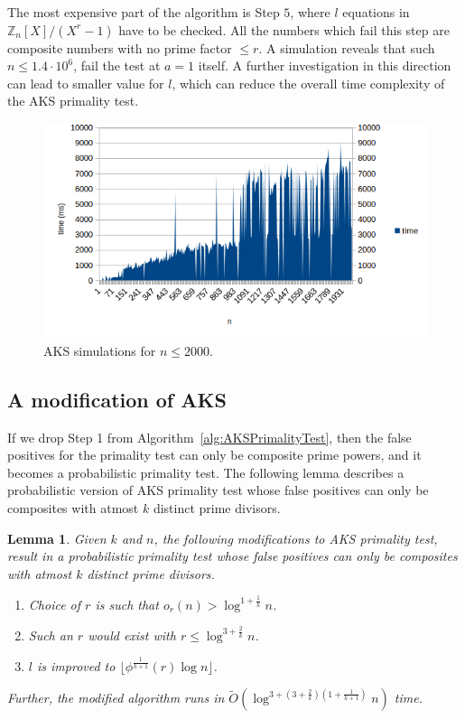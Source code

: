 \documentclass[11pt]{article}
\newtheorem{lemma}[theorem]{Lemma}
\begin{document}
The most expensive part of the algorithm is Step $5$, where $l$ equations in $\mathbb{Z}_n[X]/(X^r-1)$ have to be checked. All the numbers which fail this step are composite numbers with no prime factor $\leq r$. A simulation reveals that such $n \leq 1.4 \cdot 10^6$, fail the test at $a = 1$ itself. A further investigation in this direction can lead to smaller value for $l$, which can reduce the overall time complexity of the AKS primality test.

\begin{figure}
  \includegraphics[width=\linewidth]{pictures/n-time-2000.png}
  \caption{AKS simulations for $n \leq 2000$.}
  \label{fig:aks_2000}
\end{figure}

\subsection{A modification of AKS}
If we drop Step 1 from Algorithm~\ref{alg:AKSPrimalityTest}, then the false positives for the primality test can only be composite prime powers, and it becomes a probabilistic primality test. The following lemma describes a probabilistic version of AKS primality test whose false positives can only be composites with atmost $k$ distinct prime divisors.

\begin{lemma}
\label{lemma:AKSGenerelisation1}
Given $k$ and $n$, the following modifications to AKS primality test, result in a probabilistic primality test whose false positives can only be composites with atmost $k$ distinct prime divisors.
\begin{enumerate}[1.]%
\item Choice of $r$ is such that $o_r(n) > \log^{1 + \frac 1 {k}} n$.
\item Such an $r$ would exist with $r \leq \log^{3 + \frac 2 {k}} n$.
\item $l$ is improved to $\lfloor \phi^\frac{1}{k+1}(r) \log n \rfloor$.
\end{enumerate}
Further, the modified algorithm runs in $\tilde O(\log^{3 + (3 + \frac{2}{k})(1 + \frac{1}{k+1})} n)$ time.
\end{lemma}
\end{document}
